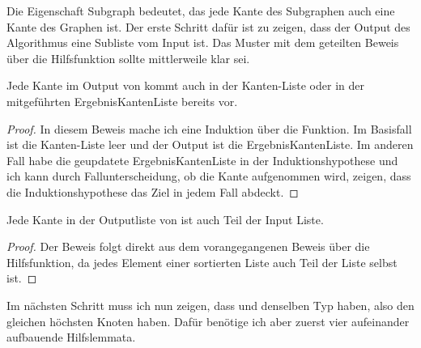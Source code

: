 Die Eigenschaft Subgraph bedeutet, das jede Kante des Subgraphen auch eine Kante des Graphen ist.
Der erste Schritt dafür ist zu zeigen, dass der Output des Algorithmus eine Subliste vom Input ist.
Das Muster mit dem geteilten Beweis über die Hilfsfunktion sollte mittlerweile klar sei.

\begin{lemma}[\Kruskalkruskalhelpersublist]\label{Kruskalkruskalhelpersublist}
  Jede Kante im Output von \Kruskalkruskalhelper kommt auch in der Kanten-Liste oder in der mitgeführten ErgebnisKantenListe bereits vor.
\end{lemma}
\begin{proof}
  In diesem Beweis mache ich eine Induktion über die Funktion.
  Im Basisfall ist die Kanten-Liste leer und der Output ist die ErgebnisKantenListe.
  Im anderen Fall habe die geupdatete ErgebnisKantenListe in der Induktionshypothese und ich kann durch Fallunterscheidung, ob die Kante aufgenommen wird, zeigen,
  dass die Induktionshypothese das Ziel in jedem Fall abdeckt.
\end{proof}



\begin{lemma}[\Kruskalkruskalsublist]
  Jede Kante in der Outputliste von \Kruskalkruskal ist auch Teil der Input Liste.
\end{lemma}
\begin{proof}
  Der Beweis folgt direkt aus dem vorangegangenen Beweis über die Hilfsfunktion, da jedes Element einer sortierten Liste auch Teil der Liste selbst ist.
\end{proof}

Im nächsten Schritt muss ich nun zeigen, dass \KruskalSimpleGraphofkruskal und \KruskalSimpleGraphofnofedgeList denselben Typ haben, also den gleichen höchsten Knoten haben.
Dafür benötige ich aber zuerst vier aufeinander aufbauende Hilfslemmata.

